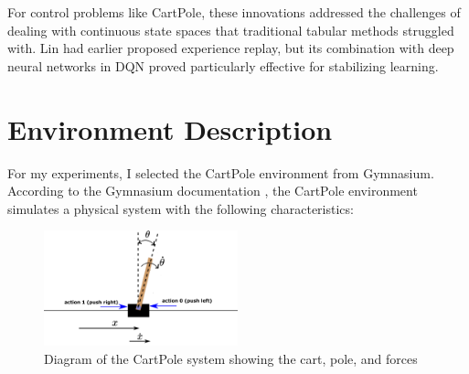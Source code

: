 \documentclass{article}
\begin{document}
For control problems like CartPole, these innovations addressed the challenges of dealing with continuous state spaces that traditional tabular methods struggled with. Lin \cite{lin1992} had earlier proposed experience replay, but its combination with deep neural networks in DQN proved particularly effective for stabilizing learning.

\section{Environment Description}

For my experiments, I selected the CartPole environment from Gymnasium. According to the Gymnasium documentation \cite{gymnasium_cartpole}, the CartPole environment simulates a physical system with the following characteristics:

\begin{figure}[h]
\centering
\includegraphics[width=0.5\textwidth]{media/cartpole_diagram.png}
\caption{Diagram of the CartPole system showing the cart, pole, and forces \cite{haber_cartpole}}
\label{fig:cartpole}
\end{figure}
\end{document}
